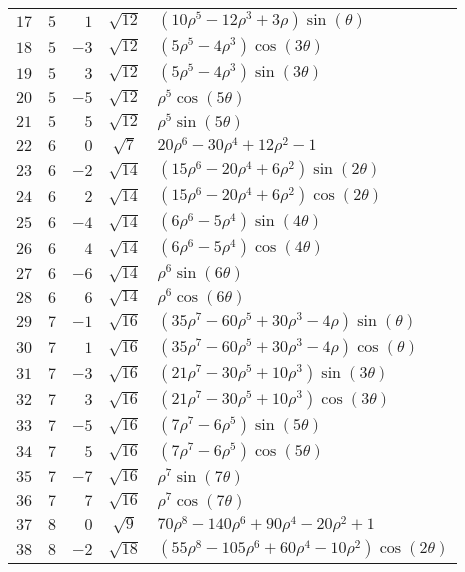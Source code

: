 \documentclass[11pt,a4paper]{article}
\begin{document}
\begin{center}
\begin{longtable}{ccrcp{}}
 $17$  & $5$  & $1$  &$\sqrt{12}$  &$(10\rho^{5} -12\rho^{3} +3\rho )\sin(\theta)$\\
 $18$  & $5$  & $-3$  &$\sqrt{12}$  &$(5\rho^{5} -4\rho^{3} )\cos(3\theta)$\\
 $19$  & $5$  & $3$  &$\sqrt{12}$  &$(5\rho^{5} -4\rho^{3} )\sin(3\theta)$\\
 $20$  & $5$  & $-5$  &$\sqrt{12}$  &$\rho^{5} \cos(5\theta)$\\
 $21$  & $5$  & $5$  &$\sqrt{12}$  &$\rho^{5} \sin(5\theta)$\\
 $22$  & $6$  & $0$  &$\sqrt{7}$  &$20\rho^{6} -30\rho^{4} +12\rho^{2} -1 $\\
 $23$  & $6$  & $-2$  &$\sqrt{14}$  &$(15\rho^{6} -20\rho^{4} +6\rho^{2} )\sin(2\theta)$\\
 $24$  & $6$  & $2$  &$\sqrt{14}$  &$(15\rho^{6} -20\rho^{4} +6\rho^{2} )\cos(2\theta)$\\
 $25$  & $6$  & $-4$  &$\sqrt{14}$  &$(6\rho^{6} -5\rho^{4} )\sin(4\theta)$\\
 $26$  & $6$  & $4$  &$\sqrt{14}$  &$(6\rho^{6} -5\rho^{4} )\cos(4\theta)$\\
 $27$  & $6$  & $-6$  &$\sqrt{14}$  &$\rho^{6} \sin(6\theta)$\\
 $28$  & $6$  & $6$  &$\sqrt{14}$  &$\rho^{6} \cos(6\theta)$\\
 $29$  & $7$  & $-1$  &$\sqrt{16}$  &$(35\rho^{7} -60\rho^{5} +30\rho^{3} -4\rho )\sin(\theta)$\\
 $30$  & $7$  & $1$  &$\sqrt{16}$  &$(35\rho^{7} -60\rho^{5} +30\rho^{3} -4\rho )\cos(\theta)$\\
 $31$  & $7$  & $-3$  &$\sqrt{16}$  &$(21\rho^{7} -30\rho^{5} +10\rho^{3} )\sin(3\theta)$\\
 $32$  & $7$  & $3$  &$\sqrt{16}$  &$(21\rho^{7} -30\rho^{5} +10\rho^{3} )\cos(3\theta)$\\
 $33$  & $7$  & $-5$  &$\sqrt{16}$  &$(7\rho^{7} -6\rho^{5} )\sin(5\theta)$\\
 $34$  & $7$  & $5$  &$\sqrt{16}$  &$(7\rho^{7} -6\rho^{5} )\cos(5\theta)$\\
 $35$  & $7$  & $-7$  &$\sqrt{16}$  &$\rho^{7} \sin(7\theta)$\\
 $36$  & $7$  & $7$  &$\sqrt{16}$  &$\rho^{7} \cos(7\theta)$\\
 $37$  & $8$  & $0$  &$\sqrt{9}$  &$70\rho^{8} -140\rho^{6} +90\rho^{4} -20\rho^{2} +1 $\\
 $38$  & $8$  & $-2$  &$\sqrt{18}$  &$(55\rho^{8} -105\rho^{6} +60\rho^{4} -10\rho^{2} )\cos(2\theta)$\\

\end{longtable}
\end{center}
\end{document}
